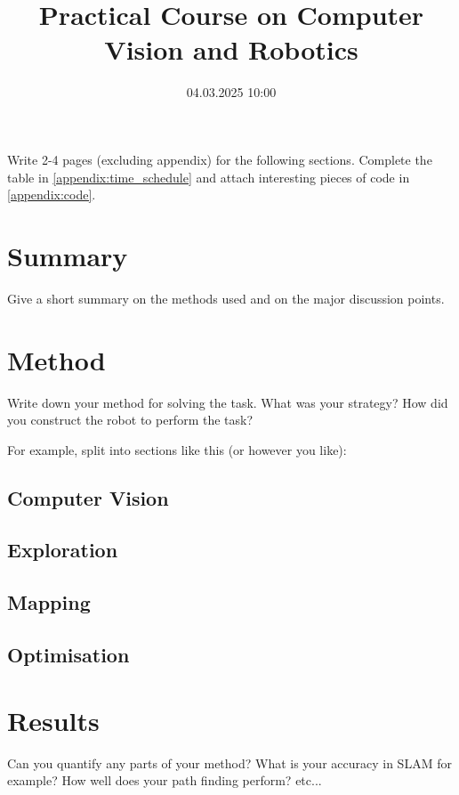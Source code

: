 \documentclass[
	12pt,
]{sty/report_style}
\title{Practical Course on Computer Vision and Robotics} %
\date{04.03.2025 10:00} %
\institute{Georg-August-Universität Göttingen \\ Drittes Physikalisches Institut} %
\begin{document}
\maketitle

\begin{problem}
    Write 2-4 pages (excluding appendix) for the following sections. Complete the table in \cref{appendix:time_schedule} and attach interesting pieces of code in \cref{appendix:code}.
\end{problem}

\section{Summary}

Give a short summary on the methods used and on the major discussion points.

\section{Method}

Write down your method for solving the task. What was your strategy? How did you construct the robot to perform the task?

For example, split into sections like this (or however you like):

\subsection{Computer Vision}

\subsection{Exploration}

\subsection{Mapping}

\subsection{Optimisation}

\section{Results}

Can you quantify any parts of your method? What is your accuracy in SLAM for example? How well does your path finding perform? etc...
\end{document}
